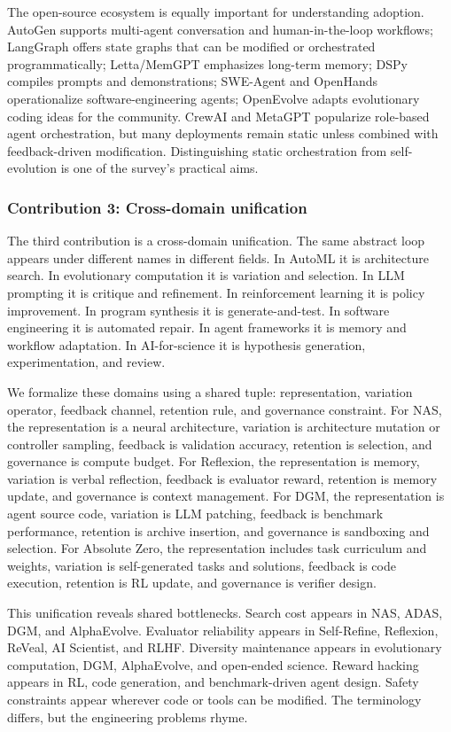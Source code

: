 The open-source ecosystem is equally important for understanding adoption. AutoGen supports multi-agent conversation and human-in-the-loop workflows; LangGraph offers state graphs that can be modified or orchestrated programmatically; Letta/MemGPT emphasizes long-term memory; DSPy compiles prompts and demonstrations; SWE-Agent and OpenHands operationalize software-engineering agents; OpenEvolve adapts evolutionary coding ideas for the community. CrewAI and MetaGPT popularize role-based agent orchestration, but many deployments remain static unless combined with feedback-driven modification. Distinguishing static orchestration from self-evolution is one of the survey's practical aims.

\subsubsection{Contribution 3: Cross-domain unification}

The third contribution is a cross-domain unification. The same abstract loop appears under different names in different fields. In AutoML it is architecture search. In evolutionary computation it is variation and selection. In LLM prompting it is critique and refinement. In reinforcement learning it is policy improvement. In program synthesis it is generate-and-test. In software engineering it is automated repair. In agent frameworks it is memory and workflow adaptation. In AI-for-science it is hypothesis generation, experimentation, and review.

We formalize these domains using a shared tuple: representation, variation operator, feedback channel, retention rule, and governance constraint. For NAS, the representation is a neural architecture, variation is architecture mutation or controller sampling, feedback is validation accuracy, retention is selection, and governance is compute budget. For Reflexion, the representation is memory, variation is verbal reflection, feedback is evaluator reward, retention is memory update, and governance is context management. For DGM, the representation is agent source code, variation is LLM patching, feedback is benchmark performance, retention is archive insertion, and governance is sandboxing and selection. For Absolute Zero, the representation includes task curriculum and weights, variation is self-generated tasks and solutions, feedback is code execution, retention is RL update, and governance is verifier design.

This unification reveals shared bottlenecks. Search cost appears in NAS, ADAS, DGM, and AlphaEvolve. Evaluator reliability appears in Self-Refine, Reflexion, ReVeal, AI Scientist, and RLHF. Diversity maintenance appears in evolutionary computation, DGM, AlphaEvolve, and open-ended science. Reward hacking appears in RL, code generation, and benchmark-driven agent design. Safety constraints appear wherever code or tools can be modified. The terminology differs, but the engineering problems rhyme.

